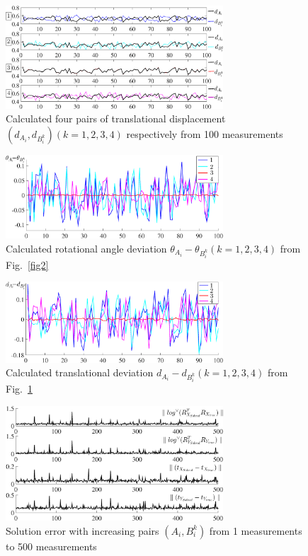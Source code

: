 \documentclass[conference,letterpaper]{IEEEtran}
\begin{document}
\begin{center}
\begin{figure}[htbp]
\centering
\includegraphics[width=3.2in]{fig3.eps}
\caption{
Calculated four pairs of translational displacement  $(d_{A_{i}},d_{B_{i}^{k}}) (k=1,2,3,4)$  respectively from 100 measurements
}
\label{fig3}
\end{figure}
\end{center}

\begin{center}
\begin{figure}[htbp]
\centering
\includegraphics[width=3.2in]{fig4.eps}
\caption{
Calculated rotational angle deviation $\theta_{A_{i}} - \theta_{B_{i}^{k}} (k=1,2,3,4)$ from Fig.~\ref{fig2}
}
\label{fig4}
\end{figure}
\end{center}

\begin{center}
\begin{figure}[htbp]
\centering
\includegraphics[width=3.2in]{fig5.eps}
\caption{
Calculated translational deviation $d_{A_{i}} - d_{B_{i}^{k}} (k=1,2,3,4)$ from Fig.~\ref{fig3}
}
\label{fig5}
\end{figure}
\end{center}

\begin{center}
\begin{figure}[htbp]
\centering
\includegraphics[width=3.2in]{fig6.eps}
\caption{
Solution error with increasing pairs $(A_{i},B_{i}^{k})$ from 1 measurements to 500 measurements
}
\label{fig6}
\end{figure}
\end{center}
\end{document}
